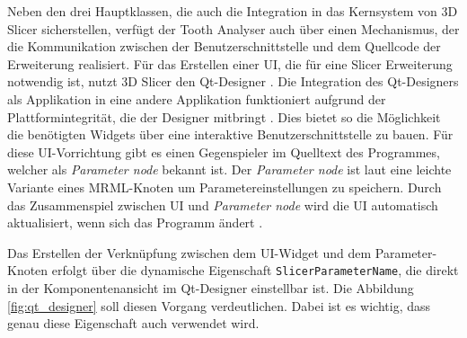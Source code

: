 Neben den drei Hauptklassen, die auch die Integration in das Kernsystem von 3D
Slicer sicherstellen, verfügt der Tooth Analyser auch über einen Mechanismus,
der die Kommunikation zwischen der Benutzerschnittstelle und dem Quellcode der
Erweiterung realisiert. Für das Erstellen einer \ac{UI}, die für eine Slicer Erweiterung
notwendig ist, nutzt 3D Slicer den Qt-Designer \citep[vgl.][]{qt2024}. Die
Integration des Qt-Designers als Applikation in eine andere Applikation
funktioniert aufgrund der Plattformintegrität, die der Designer mitbringt \citep[vgl.][]{qt2024}.
Dies bietet so die Möglichkeit die benötigten Widgets über eine interaktive Benutzerschnittstelle
zu bauen. Für diese \ac{UI}-Vorrichtung gibt es einen Gegenspieler im Quelltext des
Programmes, welcher als \textit{Parameter node} bekannt ist. Der \textit{Parameter
node} ist laut \citet{slicer2024} eine leichte Variante eines \ac{MRML}-Knoten um
Parametereinstellungen zu speichern. Durch das Zusammenspiel zwischen \ac{UI} und
\textit{Parameter node} wird die \ac{UI} automatisch aktualisiert, wenn sich das
Programm ändert \citep[vgl.][]{slicer2024}.

Das Erstellen der Verknüpfung zwischen dem \ac{UI}-Widget und dem Parameter-Knoten
erfolgt über die dynamische Eigenschaft \texttt{SlicerParameterName}, die direkt
in der Komponentenansicht im Qt-Designer einstellbar ist. Die Abbildung \ref{fig:qt_designer}
soll diesen Vorgang verdeutlichen. Dabei ist es wichtig, dass genau diese Eigenschaft
auch verwendet wird.

